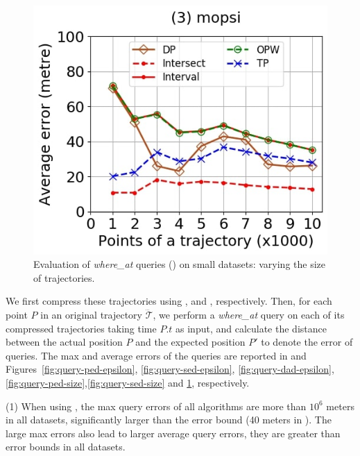 {\begin{figure}[tb!]
	\includegraphics[scale=0.250]{Figures/Exp-where-DAD-error-size-mopsi.jpg}	
	\vspace{-2ex}
	\caption{\small Evaluation of {\emph{where\_at}} queries (\dad) on small datasets: varying the size of trajectories.}
	\label{fig:query-dad-size}
	\vspace{-1ex}
\end{figure}


{We first compress these trajectories using \ped, \sed and \dad, respectively. }
{Then, for each point $P$ in an original trajectory $\dddot{\mathcal{T}}$, we perform a \emph{where\_at} query on each of its compressed trajectories taking time $P.t$ as input, and calculate the distance between the actual position $P$ and the expected position $P'$ to denote the error of queries.
}
%
{The max and average errors of the queries are reported in  and Figures~\ref{fig:query-ped-epsilon}, \ref{fig:query-sed-epsilon}, \ref{fig:query-dad-epsilon}, \ref{fig:query-ped-size},\ref{fig:query-sed-size} and \ref{fig:query-dad-size}, respectively.}






\ni (1) When using \ped, the max query errors of all algorithms are more than $10^6$ meters in all datasets, significantly larger than the error bound (40 meters in ). The large max errors also lead to larger average query errors, \ie they are greater than error bounds in all datasets.


}
